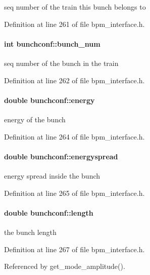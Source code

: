 seq number of the train this bunch belongs to 

Definition at line 261 of file bpm\_\-interface.h.
\paragraph[bunch\_\-num]{\setlength{\rightskip}{0pt plus 5cm}int {\bf bunchconf::bunch\_\-num}}\hfill\label{structbunchconf_eb875731eeb9ed42e0ff30356bbf77d2}


seq number of the bunch in the train 

Definition at line 262 of file bpm\_\-interface.h.
\paragraph[energy]{\setlength{\rightskip}{0pt plus 5cm}double {\bf bunchconf::energy}}\hfill\label{structbunchconf_4b460ca05a551c27b1971d0d9f9cd448}


energy of the bunch 

Definition at line 264 of file bpm\_\-interface.h.
\paragraph[energyspread]{\setlength{\rightskip}{0pt plus 5cm}double {\bf bunchconf::energyspread}}\hfill\label{structbunchconf_3025ff841f30742837034239fa94cee8}


energy spread inside the bunch 

Definition at line 265 of file bpm\_\-interface.h.
\paragraph[length]{\setlength{\rightskip}{0pt plus 5cm}double {\bf bunchconf::length}}\hfill\label{structbunchconf_d0f7556a5e2d780a9925377b5decda90}


the bunch length 

Definition at line 267 of file bpm\_\-interface.h.

Referenced by get\_\-mode\_\-amplitude().
